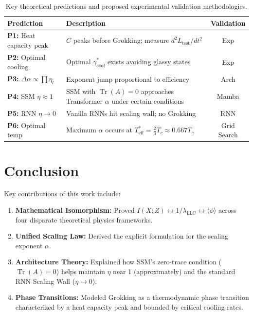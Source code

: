 \documentclass[11pt, a4paper]{article}
\theoremstyle{plain}
\DeclareMathOperator{\Tr}{Tr}
\begin{document}
\begin{table}[h]
\centering
\caption{Key theoretical predictions and proposed experimental validation methodologies.}
\vspace{0.2cm}
\begin{tabular}{lp{8cm}c}
\toprule
\textbf{Prediction} & \textbf{Description} & \textbf{Validation} \\
\midrule
\textbf{P1:} Heat capacity peak & $C$ peaks before Grokking; measure $d^2L_{\text{test}}/dt^2$ & Exp \\
\textbf{P2:} Optimal cooling & Optimal $\gamma_{\text{cool}}^*$ exists avoiding glassy states & Exp \\
\textbf{P3:} $\Delta\alpha\propto\prod\eta_l$ & Exponent jump proportional to efficiency & Arch \\
\textbf{P4:} SSM $\eta\approx1$ & SSM with $\Tr(A)=0$ approaches Transformer $\alpha$ under certain conditions & Mamba \\
\textbf{P5:} RNN $\eta\to0$ & Vanilla RNNs hit scaling wall; no Grokking & RNN \\
\textbf{P6:} Optimal temp & Maximum $\alpha$ occurs at $T_{\text{eff}}^* = \frac{2}{3} T_c \approx 0.667 T_c$ & Grid Search \\
\bottomrule
\end{tabular}
\label{tab:predictions}
\end{table}

\section{Conclusion}

Key contributions of this work include:
\begin{enumerate}
    \item \textbf{Mathematical Isomorphism:} Proved $I(X;Z)\leftrightarrow1/\lambda_{\text{LLC}}\leftrightarrow\langle\phi\rangle$ across four disparate theoretical physics frameworks.
    \item \textbf{Unified Scaling Law:} Derived the explicit formulation for the scaling exponent $\alpha$.
    \item \textbf{Architecture Theory:} Explained how SSM's zero-trace condition ($\Tr(A)=0$) helps maintain $\eta$ near 1 (approximately) and the standard RNN Scaling Wall ($\eta\to0$).
    \item \textbf{Phase Transitions:} Modeled Grokking as a thermodynamic phase transition characterized by a heat capacity peak and bounded by critical cooling rates.
\end{enumerate}
\end{document}
